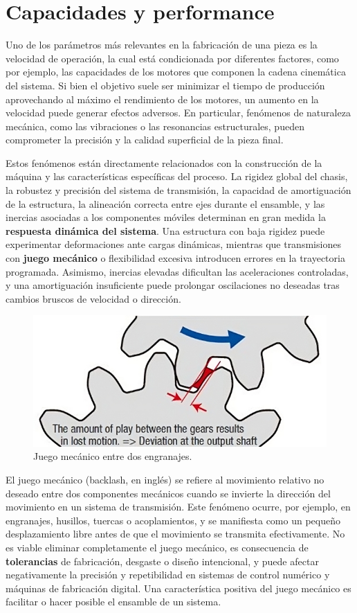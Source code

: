 \section{Capacidades y performance}

Uno de los parámetros más relevantes en la fabricación de una pieza es la velocidad de operación, la cual está condicionada por diferentes factores, como por ejemplo, las capacidades de los motores que componen la cadena cinemática del sistema. Si bien el objetivo suele ser minimizar el tiempo de producción aprovechando al máximo el rendimiento de los motores, un aumento en la velocidad puede generar efectos adversos. En particular, fenómenos de naturaleza mecánica, como las vibraciones o las resonancias estructurales, pueden comprometer la precisión y la calidad superficial de la pieza final.

Estos fenómenos están directamente relacionados con la construcción de la máquina y las características específicas del proceso. La rigidez global del chasis, la robustez y precisión del sistema de transmisión, la capacidad de amortiguación de la estructura, la alineación correcta entre ejes durante el ensamble, y las inercias asociadas a los componentes móviles determinan en gran medida la \textbf{respuesta dinámica del sistema}. Una estructura con baja rigidez puede experimentar deformaciones ante cargas dinámicas, mientras que transmisiones con \textbf{juego mecánico} o flexibilidad excesiva introducen errores en la trayectoria programada. Asimismo, inercias elevadas dificultan las aceleraciones controladas, y una amortiguación insuficiente puede prolongar oscilaciones no deseadas tras cambios bruscos de velocidad o dirección.


\begin{figure}[h!]
    \centering
    \includegraphics[width=0.7\linewidth]{imgs/gears.png}
    \caption{Juego mecánico entre dos engranajes.}
    \label{gears}
\end{figure}

El juego mecánico (backlash, en inglés) se refiere al movimiento relativo no deseado entre dos componentes mecánicos cuando se invierte la dirección del movimiento en un sistema de transmisión. Este fenómeno ocurre, por ejemplo, en engranajes, husillos, tuercas o acoplamientos, y se manifiesta como un pequeño desplazamiento libre antes de que el movimiento se transmita efectivamente. No es viable eliminar completamente el juego mecánico, es consecuencia de \textbf{tolerancias} de fabricación, desgaste o diseño intencional, y puede afectar negativamente la precisión y repetibilidad en sistemas de control numérico y máquinas de fabricación digital. Una característica positiva del juego mecánico es facilitar o hacer posible el ensamble de un sistema.

